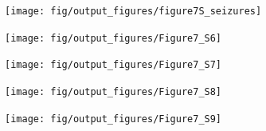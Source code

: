 \documentclass[a4paper,12pt]{article}
\begin{document}
{\clearpage

\begin{figure}[p]
    \internallinenumbers
    \centering
        \texttt{[image: fig/output\_figures/figure7S\_seizures]}
    \caption{}
\end{figure}

\clearpage

\begin{figure}[p]
    \internallinenumbers
    \centering
        \texttt{[image: fig/output\_figures/Figure7\_S6]}
    \caption{}
\end{figure}

\clearpage

\begin{figure}[p]
    \internallinenumbers
    \centering
        \texttt{[image: fig/output\_figures/Figure7\_S7]}
    \caption{}
\end{figure}

\clearpage

\begin{figure}[p]
    \internallinenumbers
    \centering
        \texttt{[image: fig/output\_figures/Figure7\_S8]}
    \caption{}
\end{figure}

\clearpage

\begin{figure}[p]
    \internallinenumbers
    \centering
        \texttt{[image: fig/output\_figures/Figure7\_S9]}
    \caption{}
\end{figure}

\clearpage

}
\end{document}
